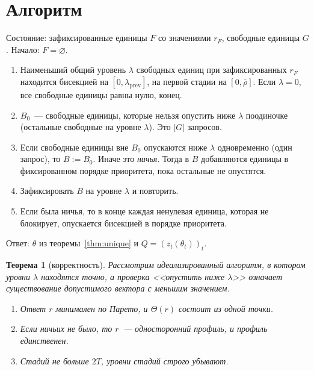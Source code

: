 \documentclass[a4paper,11pt]{article}
\theoremstyle{plain}
\newtheorem{theorem}{Теорема}[section]
\theoremstyle{definition}
\theoremstyle{remark}
\newcommand{\abs}[1]{\left\lvert #1 \right\rvert}
\begin{document}
\section{Алгоритм}

Состояние: зафиксированные единицы $F$ со значениями $r_F$, свободные единицы $G$. Начало: $F=\varnothing$.
\begin{enumerate}
    \item Наименьший общий уровень $\lambda$ свободных единиц при зафиксированных $r_F$ находится бисекцией на $[0,\lambda_{\mathrm{prev}}]$, на первой стадии на $[0,\bar\rho]$. Если $\lambda=0$, все свободные единицы равны нулю, конец.
    \item $B_0$~--- свободные единицы, которые нельзя опустить ниже $\lambda$ поодиночке (остальные свободные на уровне $\lambda$). Это $\abs G$ запросов.
    \item Если свободные единицы вне $B_0$ опускаются ниже $\lambda$ одновременно (один запрос), то $B:=B_0$. Иначе это \textit{ничья}. Тогда в $B$ добавляются единицы в фиксированном порядке приоритета, пока остальные не опустятся.
    \item Зафиксировать $B$ на уровне $\lambda$ и повторить.
    \item Если была ничья, то в конце каждая ненулевая единица, которая не блокирует, опускается бисекцией в порядке приоритета.
\end{enumerate}
Ответ: $\theta$ из теоремы~\ref{thm:unique} и $Q=(z_t(\theta_t))_t$.

\begin{theorem}[корректность]\label{thm:correct}
    Рассмотрим идеализированный алгоритм, в котором уровни $\lambda$ находятся точно, а проверка <<опустить ниже $\lambda$>> означает существование допустимого вектора с меньшим значением.
    \begin{enumerate}[label=(\alph*)]
        \item Ответ $r$ минимален по Парето, и $\Theta(r)$ состоит из одной точки.
        \item Если ничьих не было, то $r$~--- односторонний профиль, и профиль единственен.
        \item Стадий не больше $2T$, уровни стадий строго убывают.
    \end{enumerate}
\end{theorem}
\end{document}
